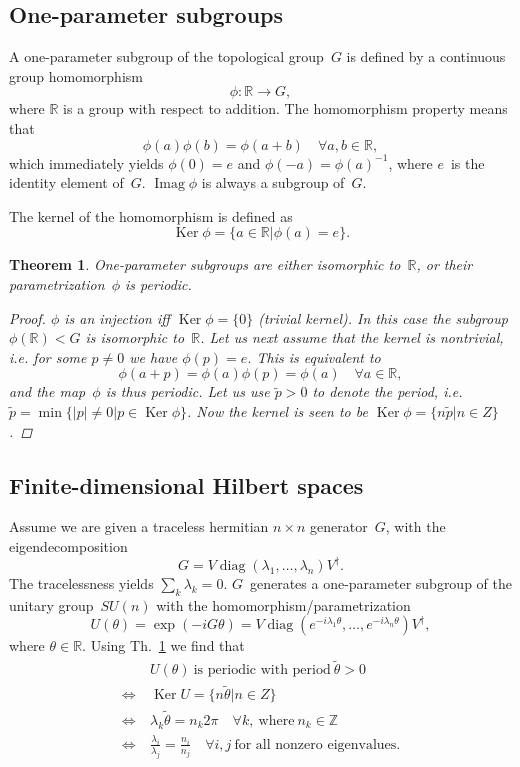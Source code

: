 \documentclass[aps,pra,10pt,twocolumn,groupedaddress,nofootinbib]{revtex4-1}
\theoremstyle{plain}
\newtheorem{theorem}{Theorem}%
\DeclareMathOperator{\diag}{diag}  %
\DeclareMathOperator{\Ker}{Ker}    %
\DeclareMathOperator{\Imag}{Imag}  %
\newcommand{\be}{\begin{equation}}
\newcommand{\ee}{\end{equation}}
\newcommand{\Z}{\ensuremath{\mathbb Z}}  %
\newcommand{\R}{\ensuremath{\mathbb R}}  %
\begin{document}
\subsection{One-parameter subgroups}

A one-parameter subgroup of the topological group~$G$ is defined by a continuous group homomorphism
\be
\phi: \R \to G,
\ee
where $\R$ is a group with respect to addition.
The homomorphism property means that
\be
\phi(a)\phi(b) = \phi(a+b) \quad \forall a,b \in \R,
\ee
which immediately yields
$\phi(0) = e$ and $\phi(-a) = \phi(a)^{-1}$,
where $e$~is the identity element of~$G$.
$\Imag \phi$ is always a subgroup of~$G$.

The kernel of the homomorphism is defined as
\be
\Ker \phi = \{a \in \R | \phi(a) = e\}.
\ee

\begin{theorem}
  \label{th:1psg}
One-parameter subgroups are either isomorphic to~$\R$, or their parametrization~$\phi$ is periodic.

\begin{proof}
$\phi$ is an injection iff $\Ker \phi = \{0\}$ (trivial kernel).
In this case the subgroup $\phi(\R) < G$ is isomorphic to~$\R$.
Let us next assume that the kernel is nontrivial, i.e. for some $p \neq 0$ we have
$\phi(p) = e$.
This is equivalent to
\be
\phi(a+p) = \phi(a)\phi(p) = \phi(a) \quad \forall a \in \R,
\ee
and the map~$\phi$ is thus periodic. Let us use $\tilde{p}>0$
to denote the period, i.e.
$\tilde{p} = \min \{|p| \neq 0 | p \in \Ker \phi\}$.
Now the kernel is seen to be $\Ker \phi = \{n \tilde{p} | n \in Z\}$.
\end{proof}
\end{theorem}

\subsection{Finite-dimensional Hilbert spaces}

Assume we are given a traceless hermitian $n \times n$ generator~$G$, with the eigendecomposition
\be
G = V \diag(\lambda_1, \ldots, \lambda_n) V^\dagger.
\ee
The tracelessness yields $\sum_k \lambda_k = 0$.
$G$~generates a one-parameter subgroup of the unitary group~$SU(n)$
with the homomorphism/parametrization
\be
U(\theta) = \exp(-iG\theta)
= V \diag(e^{-i\lambda_1 \theta}, \ldots, e^{-i\lambda_n \theta}) V^\dagger,
\ee
where $\theta \in \R$. Using Th.~\ref{th:1psg} we find that
\begin{align}
  & U(\theta) \: \text{is periodic with period} \: \tilde{\theta} > 0\\
  \iff \: & \Ker U = \{n \tilde{\theta} | n \in Z\}\\
  \iff \: & \lambda_k \tilde{\theta} = n_k 2 \pi \quad \forall k, \: \text{where} \: n_k \in \Z\\
  \iff \: & \frac{\lambda_i}{\lambda_j} = \frac{n_i}{n_j} \quad \forall i,j
  \: \text{for all nonzero eigenvalues.}
\end{align}
\end{document}
